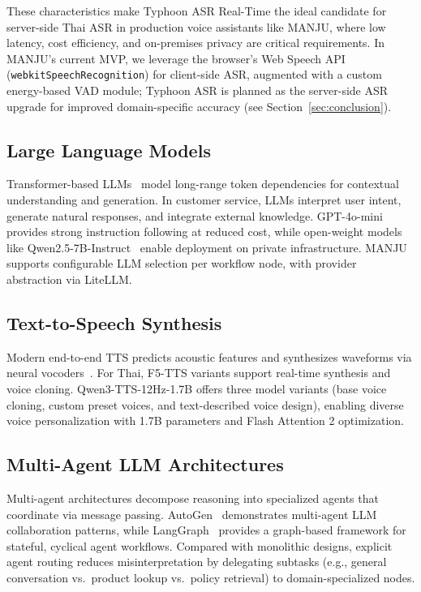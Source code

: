 \documentclass[10pt, a4paper, twocolumn]{article}
\begin{document}
\noindent These characteristics make Typhoon ASR Real-Time the ideal candidate for server-side Thai ASR in production voice assistants like MANJU, where low latency, cost efficiency, and on-premises privacy are critical requirements. In MANJU's current MVP, we leverage the browser's Web Speech API (\texttt{webkitSpeechRecognition}) for client-side ASR, augmented with a custom energy-based VAD module; Typhoon ASR is planned as the server-side ASR upgrade for improved domain-specific accuracy (see Section~\ref{sec:conclusion}).

\subsection{Large Language Models}
Transformer-based LLMs~\cite{vaswani2017attention} model long-range token dependencies for contextual understanding and generation.
In customer service, LLMs interpret user intent, generate natural responses, and integrate external knowledge.
GPT-4o-mini~\cite{openai2024gpt4o} provides strong instruction following at reduced cost, while open-weight models like Qwen2.5-7B-Instruct~\cite{qwen2024qwen25} enable deployment on private infrastructure.
MANJU supports configurable LLM selection per workflow node, with provider abstraction via LiteLLM.

\subsection{Text-to-Speech Synthesis}
Modern end-to-end TTS predicts acoustic features and synthesizes waveforms via neural vocoders~\cite{tan2021ttssurvey}.
For Thai, F5-TTS variants support real-time synthesis and voice cloning.
Qwen3-TTS-12Hz-1.7B offers three model variants (base voice cloning, custom preset voices, and text-described voice design), enabling diverse voice personalization with 1.7B parameters and Flash Attention 2 optimization.

\subsection{Multi-Agent LLM Architectures}
Multi-agent architectures decompose reasoning into specialized agents that coordinate via message passing.
AutoGen~\cite{wu2023autogen} demonstrates multi-agent LLM collaboration patterns, while LangGraph~\cite{langgraph2024} provides a graph-based framework for stateful, cyclical agent workflows.
Compared with monolithic designs, explicit agent routing reduces misinterpretation by delegating subtasks (e.g., general conversation vs.\ product lookup vs.\ policy retrieval) to domain-specialized nodes.
\end{document}
